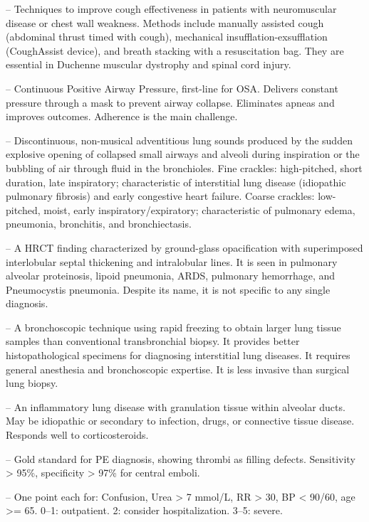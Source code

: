 -- Techniques to improve cough effectiveness in patients with neuromuscular disease or chest wall weakness. Methods include manually assisted cough (abdominal thrust timed with cough), mechanical insufflation-exsufflation (CoughAssist device), and breath stacking with a resuscitation bag. They are essential in Duchenne muscular dystrophy and spinal cord injury.

-- Continuous Positive Airway Pressure, first-line for OSA. Delivers constant pressure through a mask to prevent airway collapse. Eliminates apneas and improves outcomes. Adherence is the main challenge.

-- Discontinuous, non-musical adventitious lung sounds produced by the sudden explosive opening of collapsed small airways and alveoli during inspiration or the bubbling of air through fluid in the bronchioles. Fine crackles: high-pitched, short duration, late inspiratory; characteristic of interstitial lung disease (idiopathic pulmonary fibrosis) and early congestive heart failure. Coarse crackles: low-pitched, moist, early inspiratory/expiratory; characteristic of pulmonary edema, pneumonia, bronchitis, and bronchiectasis.

-- A HRCT finding characterized by ground-glass opacification with superimposed interlobular septal thickening and intralobular lines. It is seen in pulmonary alveolar proteinosis, lipoid pneumonia, ARDS, pulmonary hemorrhage, and Pneumocystis pneumonia. Despite its name, it is not specific to any single diagnosis.

-- A bronchoscopic technique using rapid freezing to obtain larger lung tissue samples than conventional transbronchial biopsy. It provides better histopathological specimens for diagnosing interstitial lung diseases. It requires general anesthesia and bronchoscopic expertise. It is less invasive than surgical lung biopsy.

-- An inflammatory lung disease with granulation tissue within alveolar ducts. May be idiopathic or secondary to infection, drugs, or connective tissue disease. Responds well to corticosteroids.

-- Gold standard for PE diagnosis, showing thrombi as filling defects. Sensitivity > 95\%, specificity > 97\% for central emboli.

-- One point each for: Confusion, Urea > 7 mmol/L, RR > 30, BP < 90/60, age >= 65. 0--1: outpatient. 2: consider hospitalization. 3--5: severe.

